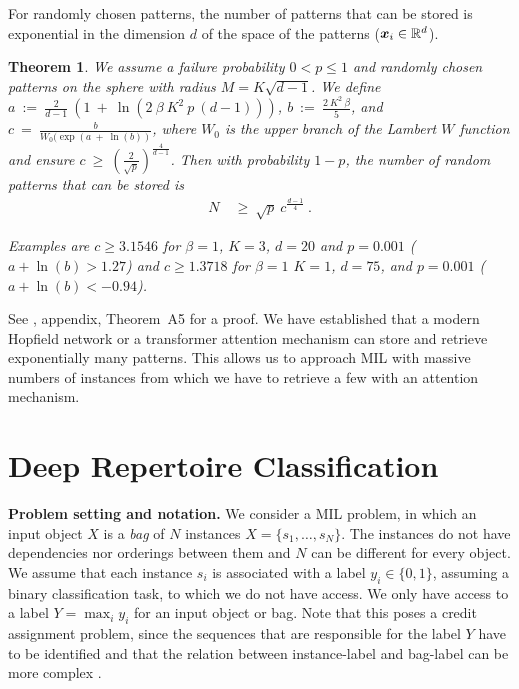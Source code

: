 \documentclass[oneside]{book}
\newtheorem{theorem}{Theorem}
\newcommand\Bx{\bm{x}}
\renewcommand{\leq}{\leqslant}
\begin{document}
For randomly chosen patterns, the number of patterns that can be stored
is exponential in the dimension $d$ of the space of the patterns ($\Bx_i \in \dR^d$).
\begin{theorem}
\label{th:2}
We assume a failure probability $0<p\leq 1$ and randomly chosen patterns 
on the sphere with radius $M=K \sqrt{d-1}$. 
We define  $ a \ := \  \frac{2}{d-1} \ (1 \ + \ \ln(2 \ \beta \ K^2 \  p \  (d-1)))$, 
$b \ := \ \frac{2 \ K^2 \ \beta}{5}$,
and $c \ = \ \frac{b}{W_0(\exp(a \ + \ \ln(b))}$,
where $W_0$ is the upper branch of the Lambert $W$ function 
and ensure $c \ \geq \ \left( \frac{2}{ \sqrt{p}}\right)^{\frac{4}{d-1}}$.
Then with probability $1-p$, the number of random patterns 
that can be stored is  
\begin{align} 
    N \ &\geq \ \sqrt{p} \ c^{\frac{d-1}{4}}  \ .
\end{align}

Examples are $c\geq 3.1546$ for
$\beta=1$, $K=3$, $d= 20$ and $p=0.001$ ($a + \ln(b)>1.27$)
and  $c\geq 1.3718$ for $\beta = 1$ $K=1$, $d = 75$, and $p=0.001$
($a + \ln(b)<-0.94$).
\end{theorem}
See \cite{Ramsauer:20}, appendix, Theorem~A5 %
for a proof. We have established that
a modern Hopfield network or a transformer attention mechanism can store
and retrieve exponentially many patterns.
This allows us to approach
MIL with massive numbers of instances from
which we have to retrieve a few with an attention mechanism.

%

\vspace{\cheatspace}
\section*{Deep Repertoire Classification} 
\vspace{\cheatspace}
\label{sec:deeprc}
\textbf{Problem setting and notation.} We consider a MIL problem, in 
which an input object $X$ is a \emph{bag} of 
$N$ instances $X=\{s_1,\ldots,s_{N}\}$. The instances 
%
do not have dependencies nor orderings between them
and $N$ can be different for every object. 
We assume that each instance $s_{i}$ is associated with 
a label $y_i \in \{0,1\}$, assuming a binary classification task, 
to which we do not have access. We only
have access to a label $Y=\max_i{y_i}$ for an input object
or bag.
Note that this poses a credit assignment problem, since the
sequences that are responsible for the label $Y$ have to be identified
and that the relation between instance-label and bag-label can be more
complex \citep{foulds2010review}.
\end{document}
